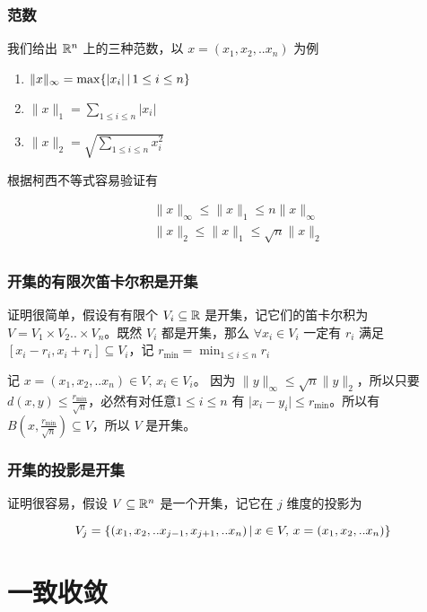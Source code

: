 \subsection{范数}

我们给出 $\mathbb{R}^n$ 上的三种范数，以 $x =(x_1, x_2,..x_n)$ 为例

\begin{enumerate}
    \item $\| x\|_\infty = \max \{ \lvert x_i \rvert  \,\vert\, 1 \le i \le n\}$
    \item $\| x\|_1 = \sum_{1 \le i \le n} \lvert x_i\rvert$
    \item $\| x\|_2 = \sqrt{\sum_{1 \le i \le n} x_i^2}$
\end{enumerate}

根据柯西不等式容易验证有

\begin{align*}
   & \| x\|_\infty \le \| x\|_1 \le n\| x\|_\infty \\
   & \| x\|_2 \le \| x\|_1 \le \sqrt{n}\| x\|_2 \\
\end{align*}

\subsection{开集的有限次笛卡尔积是开集}

证明很简单，假设有有限个 $V_i \subseteq \mathbb{R}$ 是开集，记它们的笛卡尔积为 $V = V_1 \times V_2 .. \times V_n$。既然  $V_i$ 都是开集，那么 $\forall x_i \in V_i$ 一定有 $r_i$ 满足 $[x_i - r_i,x_i + r_i] \subseteq V_i$，记 $r_{\min} = \min_{1 \le i \le n}r_i$

记 $x=(x_1, x_2, .. x_n) \in V,\, x_i \in V_i$。 因为 $\| y\|_{\infty} \le \sqrt{n}\| y\|_2$，所以只要 $d(x,y) \le \frac{r_{\min}}{\sqrt{n}}$，必然有对任意$1 \le i \le n$ 有 $\lvert x_i - y_i\rvert \le r_{\min}$。所以有
$B(x, \frac{r_{\min}}{\sqrt{n}}) \subseteq V$，所以 $V$ 是开集。 


\subsection{开集的投影是开集}

证明很容易，假设 $V \subseteq \mathbb{R}^n$ 是一个开集，记它在 $j$ 维度的投影为

\[
V_j = \{ (x_1, x_2, ..x_{j-1},x_{j+1},..x_n) \,\vert\, x \in V,\, x =(x_1,x_2,..x_n) \}
\]



\chapter{一致收敛}

